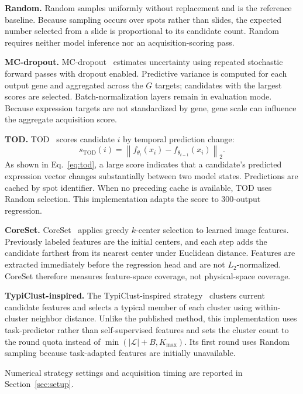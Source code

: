\documentclass[]{spie}
\begin{document}
\noindent\textbf{Random.}
Random samples uniformly without replacement and is the reference baseline. Because sampling occurs over spots rather than slides, the expected number selected from a slide is proportional to its candidate count. Random requires neither model inference nor an acquisition-scoring pass.

\noindent\textbf{MC-dropout.}
MC-dropout~\cite{gal2016dropout,gal2017deep} estimates uncertainty using repeated stochastic forward passes with dropout enabled. Predictive variance is computed for each output gene and aggregated across the $G$ targets; candidates with the largest scores are selected. Batch-normalization layers remain in evaluation mode. Because expression targets are not standardized by gene, gene scale can influence the aggregate acquisition score.

\noindent\textbf{TOD.}
TOD~\cite{huang2021semi} scores candidate $i$ by temporal prediction change:
\begin{equation}
s_{\mathrm{TOD}}(i)=\left\|f_{\theta_t}(x_i)-f_{\theta_{t-1}}(x_i)\right\|_2.
\label{eq:tod}
\end{equation}
As shown in Eq.~\ref{eq:tod}, a large score indicates that a candidate's predicted expression vector changes substantially between two model states. Predictions are cached by spot identifier. When no preceding cache is available, TOD uses Random selection. This implementation adapts the score to 300-output regression.

\noindent\textbf{CoreSet.}
CoreSet~\cite{sener2018active} applies greedy $k$-center selection to learned image features. Previously labeled features are the initial centers, and each step adds the candidate farthest from its nearest center under Euclidean distance. Features are extracted immediately before the regression head and are not $L_2$-normalized. CoreSet therefore measures feature-space coverage, not physical-space coverage.

\noindent\textbf{TypiClust-inspired.}
The TypiClust-inspired strategy~\cite{hacohen2022active} clusters current candidate features and selects a typical member of each cluster using within-cluster neighbor distance. Unlike the published method, this implementation uses task-predictor rather than self-supervised features and sets the cluster count to the round quota instead of $\min(|\mathcal{L}|+B,K_{\max})$. Its first round uses Random sampling because task-adapted features are initially unavailable.

Numerical strategy settings and acquisition timing are reported in Section~\ref{sec:setup}.
\end{document}
